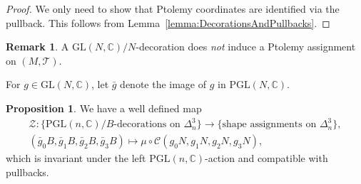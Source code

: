 \documentclass[12pt]{amsart}
\theoremstyle{definition}
\newtheorem{proposition}[theorem]{Proposition}
\newtheorem{remark}[theorem]{Remark}
\numberwithin{equation}{section}
\def\PGL{\mathrm{PGL}}
\def\GL{\mathrm{GL}}
\def\C{\mathbb{C}}
\def\T{\mathcal{T}}
\begin{document}
\begin{proof}
We only need to show that Ptolemy coordinates are identified via the pullback. This follows from Lemma~\ref{lemma:DecorationsAndPullbacks}.
\end{proof}

\begin{remark}
A $\GL(N,\C)/N$-decoration does \emph{not} induce a Ptolemy assignment on $(M,\T)$.
\end{remark}

For $g\in\GL(N,\C)$, let $\bar{g}$ denote the image of $g$ in $\PGL(N,\C)$. 

\begin{proposition}\label{prop:DefofZ}
We have a well defined map
\begin{equation}
\begin{gathered}
\mathcal Z\colon\text{\{$\PGL(n,\C)/B$-decorations on $\Delta^3_n$\}}\to\text{\{shape assignments on $\Delta^3_n$\}},\\
(\bar{g}_0B,\bar{g}_1B,\bar{g}_2B,\bar{g}_3B)\mapsto\mu\circ\mathcal C(g_0N,g_1N,g_2N,g_3N),
\end{gathered}
\end{equation}
which is invariant under the left $\PGL(n,\C)$-action and compatible with pullbacks. 
\end{proposition}
\end{document}
